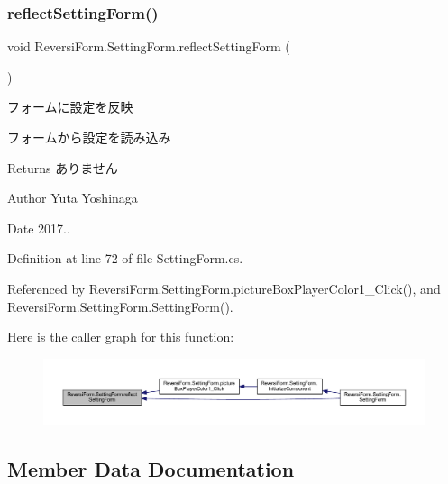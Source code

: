 \subsubsection{\texorpdfstring{reflect\+Setting\+Form()}{reflectSettingForm()}}
{\footnotesize\ttfamily void Reversi\+Form.\+Setting\+Form.\+reflect\+Setting\+Form (\begin{DoxyParamCaption}{ }\end{DoxyParamCaption})\hspace{0.3cm}{\ttfamily [private]}}



フォームに設定を反映 

フォームから設定を読み込み

\begin{DoxyReturn}{Returns}
ありません 
\end{DoxyReturn}
\begin{DoxyAuthor}{Author}
Yuta Yoshinaga 
\end{DoxyAuthor}
\begin{DoxyDate}{Date}
2017.. 
\end{DoxyDate}


Definition at line 72 of file Setting\+Form.\+cs.



Referenced by Reversi\+Form.\+Setting\+Form.\+picture\+Box\+Player\+Color1\+\_\+\+Click(), and Reversi\+Form.\+Setting\+Form.\+Setting\+Form().

Here is the caller graph for this function\+:
\nopagebreak
\begin{figure}[H]
\begin{center}
\leavevmode
\includegraphics[width=350pt]{class_reversi_form_1_1_setting_form_a7ede223d806bde4aeb790ade207ad677_icgraph}
\end{center}
\end{figure}


\subsection{Member Data Documentation}
\mbox{\label{class_reversi_form_1_1_setting_form_af7d6ca70cbe9baa786a42f9e3139c942}} 
